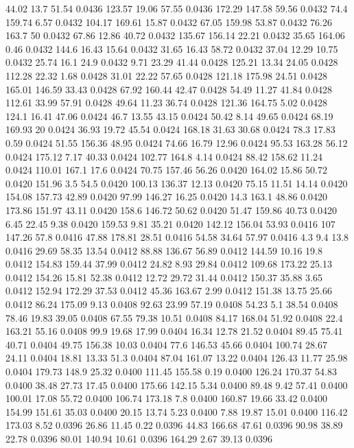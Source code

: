 44.02	13.7	51.54	0.0436
123.57	19.06	57.55	0.0436
172.29	147.58	59.56	0.0432
74.4	159.74	6.57	0.0432
104.17	169.61	15.87	0.0432
67.05	159.98	53.87	0.0432
76.26	163.7	50	0.0432
67.86	12.86	40.72	0.0432
135.67	156.14	22.21	0.0432
35.65	164.06	0.46	0.0432
144.6	16.43	15.64	0.0432
31.65	16.43	58.72	0.0432
37.04	12.29	10.75	0.0432
25.74	16.1	24.9	0.0432
9.71	23.29	41.44	0.0428
125.21	13.34	24.05	0.0428
112.28	22.32	1.68	0.0428
31.01	22.22	57.65	0.0428
121.18	175.98	24.51	0.0428
165.01	146.59	33.43	0.0428
67.92	160.44	42.47	0.0428
54.49	11.27	41.84	0.0428
112.61	33.99	57.91	0.0428
49.64	11.23	36.74	0.0428
121.36	164.75	5.02	0.0428
124.1	16.41	47.06	0.0424
46.7	13.55	43.15	0.0424
50.42	8.14	49.65	0.0424
68.19	169.93	20	0.0424
36.93	19.72	45.54	0.0424
168.18	31.63	30.68	0.0424
78.3	17.83	0.59	0.0424
51.55	156.36	48.95	0.0424
74.66	16.79	12.96	0.0424
95.53	163.28	56.12	0.0424
175.12	7.17	40.33	0.0424
102.77	164.8	4.14	0.0424
88.42	158.62	11.24	0.0424
110.01	167.1	17.6	0.0424
70.75	157.46	56.26	0.0420
164.02	15.86	50.72	0.0420
151.96	3.5	54.5	0.0420
100.13	136.37	12.13	0.0420
75.15	11.51	14.14	0.0420
154.08	157.73	42.89	0.0420
97.99	146.27	16.25	0.0420
14.3	163.1	48.86	0.0420
173.86	151.97	43.11	0.0420
158.6	146.72	50.62	0.0420
51.47	159.86	40.73	0.0420
6.45	22.45	9.38	0.0420
159.53	9.81	35.21	0.0420
142.12	156.04	53.93	0.0416
107	147.26	57.8	0.0416
47.88	178.81	28.51	0.0416
54.58	34.64	57.97	0.0416
4.3	9.4	13.8	0.0416
29.69	58.35	13.54	0.0412
88.88	136.67	56.89	0.0412
144.59	10.16	19.8	0.0412
154.83	159.44	37.99	0.0412
24.82	8.93	29.84	0.0412
109.68	173.22	25.13	0.0412
154.26	15.81	52.38	0.0412
12.72	29.72	31.44	0.0412
150.37	35.88	3.65	0.0412
152.94	172.29	37.53	0.0412
45.36	163.67	2.99	0.0412
151.38	13.75	25.66	0.0412
86.24	175.09	9.13	0.0408
92.63	23.99	57.19	0.0408
54.23	5.1	38.54	0.0408
78.46	19.83	39.05	0.0408
67.55	79.38	10.51	0.0408
84.17	168.04	51.92	0.0408
22.4	163.21	55.16	0.0408
99.9	19.68	17.99	0.0404
16.34	12.78	21.52	0.0404
89.45	75.41	40.71	0.0404
49.75	156.38	10.03	0.0404
77.6	146.53	45.66	0.0404
100.74	28.67	24.11	0.0404
18.81	13.33	51.3	0.0404
87.04	161.07	13.22	0.0404
126.43	11.77	25.98	0.0404
179.73	148.9	25.32	0.0400
111.45	155.58	0.19	0.0400
126.24	170.37	54.83	0.0400
38.48	27.73	17.45	0.0400
175.66	142.15	5.34	0.0400
89.48	9.42	57.41	0.0400
100.01	17.08	55.72	0.0400
106.74	173.18	7.8	0.0400
160.87	19.66	33.42	0.0400
154.99	151.61	35.03	0.0400
20.15	13.74	5.23	0.0400
7.88	19.87	15.01	0.0400
116.42	173.03	8.52	0.0396
26.86	11.45	0.22	0.0396
44.83	166.68	47.61	0.0396
90.98	38.89	22.78	0.0396
80.01	140.94	10.61	0.0396
164.29	2.67	39.13	0.0396
